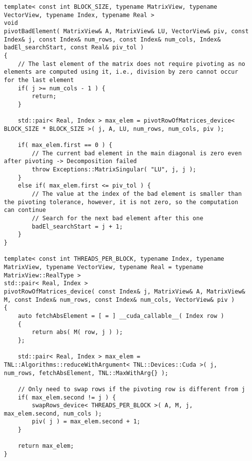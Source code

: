 \begin{lstlisting}[caption={The definition of the \code{pivotBadElement()} function which is responsible for pivoting a bad element found in column \code{j} of the main diagonal. The \code{pivotRowOfMatrices\_device()} function, presented below the \code{pivotBadElement()} function, is implemented in the parent class of \code{IterativeCroutMethod}: \code{BaseDecomposer}. Note that the variant of the \code{swapRows\_device()} function presented in the \code{pivotRowOfMatrices\_device()} swaps the rows in two matrices.},label={Listing:ICMxPP-implementation-pivot-bad-element}]
template< const int BLOCK_SIZE, typename MatrixView, typename VectorView, typename Index, typename Real >
void
pivotBadElement( MatrixView& A, MatrixView& LU, VectorView& piv, const Index& j, const Index& num_rows, const Index& num_cols, Index& badEl_searchStart, const Real& piv_tol )
{
	// The last element of the matrix does not require pivoting as no elements are computed using it, i.e., division by zero cannot occur for the last element
	if( j >= num_cols - 1 ) {
		return;
	}
	
	std::pair< Real, Index > max_elem = pivotRowOfMatrices_device< BLOCK_SIZE * BLOCK_SIZE >( j, A, LU, num_rows, num_cols, piv );
	
	if( max_elem.first == 0 ) {
		// The current bad element in the main diagonal is zero even after pivoting -> Decomposition failed
		throw Exceptions::MatrixSingular( "LU", j, j );
	}
	else if( max_elem.first <= piv_tol ) {
		// The value at the index of the bad element is smaller than the pivoting tolerance, however, it is not zero, so the computation can continue
		// Search for the next bad element after this one
		badEl_searchStart = j + 1;
	}
}

template< const int THREADS_PER_BLOCK, typename Index, typename MatrixView, typename VectorView, typename Real = typename MatrixView::RealType >
std::pair< Real, Index >
pivotRowOfMatrices_device( const Index& j, MatrixView& A, MatrixView& M, const Index& num_rows, const Index& num_cols, VectorView& piv )
{
	auto fetchAbsElement = [ = ] __cuda_callable__( Index row )
	{
		return abs( M( row, j ) );
	};
	
	std::pair< Real, Index > max_elem = TNL::Algorithms::reduceWithArgument< TNL::Devices::Cuda >( j, num_rows, fetchAbsElement, TNL::MaxWithArg{} );
	
	// Only need to swap rows if the pivoting row is different from j
	if( max_elem.second != j ) {
		swapRows_device< THREADS_PER_BLOCK >( A, M, j, max_elem.second, num_cols );
		piv( j ) = max_elem.second + 1;
	}
	
	return max_elem;
}
\end{lstlisting}

